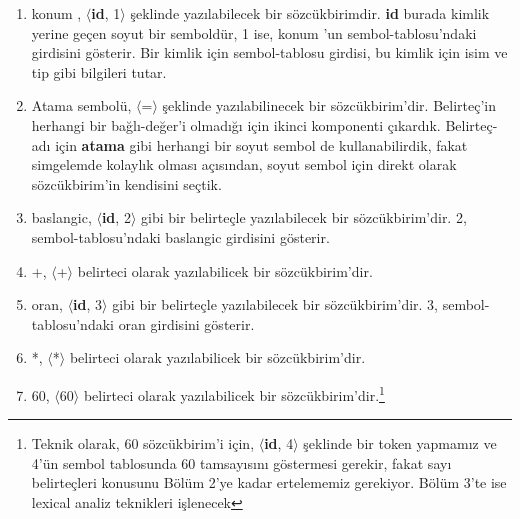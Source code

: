 \documentclass{book}
\begin{document}
\begin{enumerate}

  \item {\selectfont konum }, $\langle$\textbf{id}, 1$\rangle$ şeklinde yazılabilecek bir sözcükbirimdir. \textbf{id} burada kimlik yerine geçen soyut bir semboldür, 1 ise, {\selectfont konum }'un sembol-tablosu'ndaki girdisini gösterir. Bir kimlik için sembol-tablosu girdisi, bu kimlik için isim ve tip gibi bilgileri tutar.
  
  \item Atama sembolü, $\langle$=$\rangle$ şeklinde yazılabilinecek bir sözcükbirim'dir. Belirteç'in herhangi bir bağlı-değer'i olmadığı için ikinci komponenti çıkardık. Belirteç-adı için \textbf{atama} gibi herhangi bir soyut sembol de kullanabilirdik, fakat simgelemde kolaylık olması açısından, soyut sembol için direkt olarak sözcükbirim'in kendisini seçtik.
  
   \item {\selectfont baslangic}, $\langle$\textbf{id}, 2$\rangle$ gibi bir belirteçle yazılabilecek bir sözcükbirim'dir. 2, sembol-tablosu'ndaki {\selectfont baslangic} girdisini gösterir.
   
   \item +, $\langle$+$\rangle$ belirteci olarak yazılabilicek bir sözcükbirim'dir.
   
   \item {\selectfont oran}, $\langle$\textbf{id}, 3$\rangle$ gibi bir belirteçle yazılabilecek bir sözcükbirim'dir. 3, sembol-tablosu'ndaki {\selectfont oran} girdisini gösterir.
   
   \item *, $\langle$*$\rangle$ belirteci olarak yazılabilicek bir sözcükbirim'dir.
   
   \renewcommand{\thefootnote}{\arabic{footnote}}
   \setcounter{footnote}{0}
   
   \item 60, $\langle$60$\rangle$ belirteci olarak yazılabilicek bir sözcükbirim'dir.\footnote{Teknik olarak, 60 sözcükbirim'i için, $\langle$\textbf{id}, 4$\rangle$ şeklinde bir token yapmamız ve 4'ün sembol tablosunda 60 tamsayısını göstermesi gerekir, fakat sayı belirteçleri konusunu Bölüm 2'ye kadar ertelememiz gerekiyor. Bölüm 3'te ise lexical analiz teknikleri işlenecek} 
   
   \renewcommand{\thefootnote}{\fnsymbol{footnote}}
    
\end{enumerate} 
\end{document}
